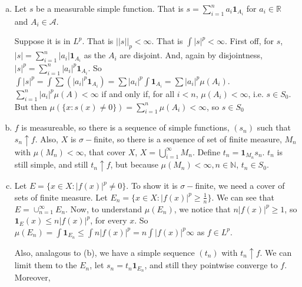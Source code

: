 \documentclass[11pt,oneside]{article}
\numberwithin{equation}{section}
\theoremstyle{definition}
\def\RR{\mathbb{R}}
\def\NN{\mathbb{N}}
\def\fancyA{\mathscr{A}}
\def\one{\mathbf{1}}
\begin{document}
\begin{solution}
\begin{enumerate}[(a)]
\item
  Let $s$ be a measurable simple function.  That is $s = \sum _{i=1}^{n} a_i \one _{A_i}$ for  $a_i \in \RR$ and $A_i \in \fancyA$.

  Suppose it is in $L^p$.  That is $|| s||_p < \infty$.  That is $\int |s| ^p < \infty$.
  First off, for $s$, $|s| =  \sum _{i=1}^{n} |a_i| \one _{A_i}$ as the $A_i$ are disjoint.
  And, again by disjointness, $|s|^p =  \sum _{i=1}^{n} |a_i|^p \one _{A_i}$.  
  So $\int |s|^p = \int \sum \left( |a_i|^p \one_{A_i} \right) = \sum |a_i|^p \int \one_{A_i} = \sum |a_i|^p \mu(A_i)$.
  $\sum _ {i=1}^{n} |a_i|^p \mu(A) < \infty$ if and only if, for all $i<n$, $\mu(A_i) < \infty$, i.e. $s \in S_0$.
  But then $\mu( \{ x : s(x) \neq 0 \}) =  \sum _{i=1}^{n} \mu( A_i ) < \infty$, so $s \in S_0$  
  
\item
  $f$ is measureable, so there is a sequence of simple functions, $(s_n)$ such that $s_n \uparrow f$.  Also, $X$ is $\sigma-$finite,
  so there is a sequence of set of finite measure, $M_n$ with $\mu( M_n) < \infty$, that
  cover $X$, $ X = \bigcup \limits _ {i=1}^{\infty} M_n$.  Define
  $t_n = \one_{M_n} s_n$.  $t_n$ is still simple, and still $t_n \uparrow f$, but because
   $\mu( M_n ) < \infty, n \in \NN$, $t_n \in S_0$.  
\item
  Let $E = \{ x \in X : | f(x) | ^p \neq 0 \}$.  To show it is $\sigma-$finite, we need a cover of
  sets of finite measure.  Let $E_n = \{ x \in X : |f(x)| ^ p \geq \frac{1}{n} \}$.  We can
  see that $E = \cup _ {n=1}^{\infty} E_n$.  Now, to understand $\mu(E_n)$, we notice that $n |f(x)| ^ p \geq 1$,
  so $\one_E(x) \leq n |f(x)|^p$, for every $x$.  So $\mu(E_n) = \int \one_{E_n} \leq \int n |f(x)| ^ p = n \int |f(x)| ^p \infty$ as
  $f \in L^p$.

  Also, analagous to (b), we have a simple sequence $(t_n)$ with $t_n \uparrow f$.  We can limit them to the
  $E_n$, let $s_n = t_n \one_{E_n}$, and still they pointwise converge to $f$.  Moreover, 
\end{enumerate}
\end{solution}
\end{document}
